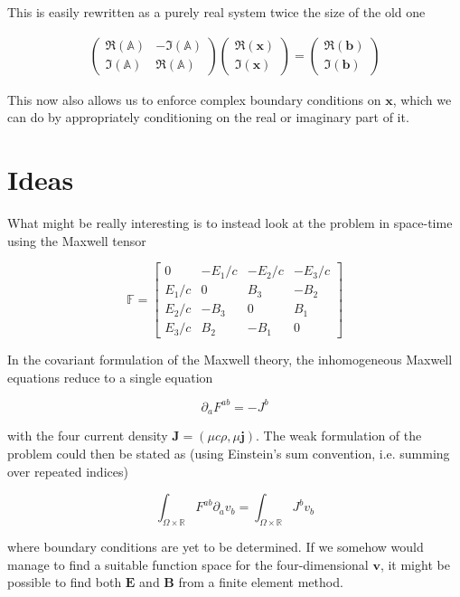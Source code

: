 \documentclass[11pt, a4paper]{article}
\begin{document}
This is easily rewritten as a purely real system twice the size of the old one 

\begin{align}
    \begin{pmatrix} \Re(\mathbb{A}) & - \Im(\mathbb{A}) \\ 
                    \Im(\mathbb{A}) & \Re(\mathbb{A}) \end{pmatrix}
    \begin{pmatrix} \Re(\mathbf{x}) \\ \Im(\mathbf{x}) \end{pmatrix}
    = 
    \begin{pmatrix} \Re(\mathbf{b}) \\ \Im(\mathbf{b}) \end{pmatrix}
\end{align}

This now also allows us to enforce complex boundary conditions on $\mathbf{x}$,
which we can do by appropriately conditioning on the real or imaginary part of it.

\section{Ideas}
\label{sec:ideas}

What might be really interesting is to instead look at the problem in space-time 
using the Maxwell tensor

\begin{equation}
    \mathbb{F} = \begin{bmatrix}
        0 & -E_1/c & -E_2/c & -E_3/c \\
        E_1/c & 0 & B_3 & -B_2 \\ 
        E_2/c & -B_3 & 0 & B_1 \\ 
        E_3/c & B_2 & -B_1 & 0
    \end{bmatrix}
\end{equation}

In the covariant formulation of the Maxwell theory, the inhomogeneous Maxwell
equations reduce to a single equation

\begin{equation}
    \partial_a F^{ab} = - J^b
\end{equation}

with the four current density $\mathbf{J} = (\mu c \rho, \mu \mathbf{j})$. The 
weak formulation of the problem could then be stated as (using Einstein's sum
convention, i.e. summing over repeated indices)

\begin{equation}
    \int_{\Omega \times \mathbb{R}} F^{ab} \partial_a v_b = \int_{\Omega \times \mathbb{R}} J^b v_b
\end{equation}

where boundary conditions are yet to be determined. If we somehow would manage
to find a suitable function space for the four-dimensional $\mathbf{v}$, it might 
be possible to find both $\mathbf{E}$ and $\mathbf{B}$ from a finite element method.


\end{document}
